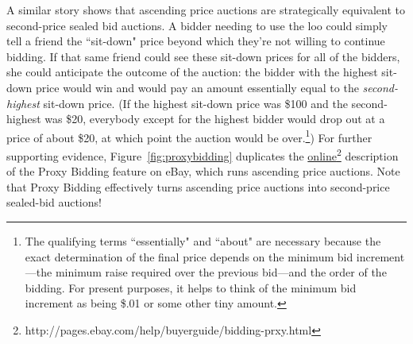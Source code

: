 A similar story shows that ascending price auctions are strategically equivalent to second-price sealed bid auctions. A bidder needing to use the loo could simply tell a friend the ``sit-down" price beyond which they're not willing to continue bidding. If that same friend could see these sit-down prices for all of the bidders, she could anticipate the outcome of the auction: the bidder with the highest sit-down price would win and would pay an amount essentially equal to the \emph{second-highest} sit-down price. (If the highest sit-down price was \$100 and the second-highest was \$20, everybody except for the highest bidder would drop out at a price of about \$20, at which point the auction would be over.\footnote{The qualifying terms ``essentially" and ``about" are necessary because the exact determination of the final price depends on the minimum bid increment---the minimum raise required over the previous bid---and the order of the bidding. For present purposes, it helps to think of the minimum bid increment as being \$.01 or some other tiny amount.}) For further supporting evidence, Figure~\ref{fig:proxybidding} duplicates the \href{http://pages.ebay.com/help/buyerguide/bidding-prxy.html}{online}\footnote{http://pages.ebay.com/help/buyerguide/bidding-prxy.html} description of the Proxy Bidding feature on eBay, which runs ascending price auctions. Note that Proxy Bidding effectively turns ascending price auctions into second-price sealed-bid auctions!




